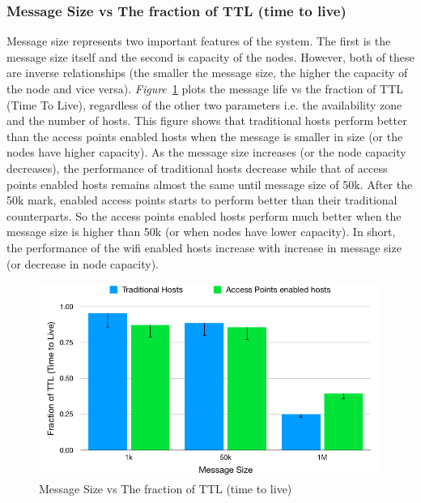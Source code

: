\subsubsection{Message Size vs The fraction of TTL (time to live)}
Message size represents two important features of the system. The first is the message size itself and the second is capacity of the nodes. However, both of these are inverse relationships (the smaller the message size, the higher the capacity of the node and vice versa). \emph{Figure}~\ref{fig:scenario1_message_size} plots the message life vs the fraction of TTL (Time To Live), regardless of the other two parameters i.e. the availability zone and the number of hosts. This figure shows that traditional hosts perform better than the access points enabled hosts when the message is smaller in size (or the nodes have higher capacity). As the message size increases (or the node capacity decreases), the performance of traditional hosts decrease while that of access points enabled hosts remains almost the same until message size of 50k. After the 50k mark, enabled access points starts to perform better than their traditional counterparts. So the access points enabled hosts perform much better when the message size is higher than 50k (or when nodes have lower capacity). In short, the performance of the wifi enabled hosts increase with increase in message size (or decrease in node capacity).

\begin{figure}[h]
  \centering
  \includegraphics[scale=0.45]{./figures/scenario1_message_size}
  \caption{Message Size vs The fraction of TTL (time to live)}
  \label{fig:scenario1_message_size}
\end{figure}
